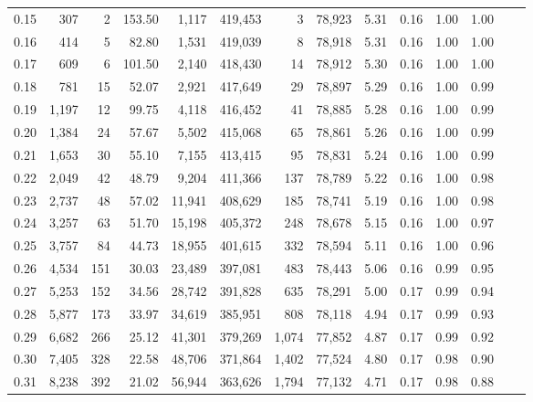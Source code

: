 \begin{tabular}{rrrrrrrrrrrrrr}
0.15 &     307 &      2 &  153.50 &    1,117 &  419,453 &       3 &  78,923 &  5.31 &  0.16 &  1.00 &      1.00 \\
0.16 &     414 &      5 &   82.80 &    1,531 &  419,039 &       8 &  78,918 &  5.31 &  0.16 &  1.00 &      1.00 \\
0.17 &     609 &      6 &  101.50 &    2,140 &  418,430 &      14 &  78,912 &  5.30 &  0.16 &  1.00 &      1.00 \\
0.18 &     781 &     15 &   52.07 &    2,921 &  417,649 &      29 &  78,897 &  5.29 &  0.16 &  1.00 &      0.99 \\
0.19 &   1,197 &     12 &   99.75 &    4,118 &  416,452 &      41 &  78,885 &  5.28 &  0.16 &  1.00 &      0.99 \\
0.20 &   1,384 &     24 &   57.67 &    5,502 &  415,068 &      65 &  78,861 &  5.26 &  0.16 &  1.00 &      0.99 \\
0.21 &   1,653 &     30 &   55.10 &    7,155 &  413,415 &      95 &  78,831 &  5.24 &  0.16 &  1.00 &      0.99 \\
0.22 &   2,049 &     42 &   48.79 &    9,204 &  411,366 &     137 &  78,789 &  5.22 &  0.16 &  1.00 &      0.98 \\
0.23 &   2,737 &     48 &   57.02 &   11,941 &  408,629 &     185 &  78,741 &  5.19 &  0.16 &  1.00 &      0.98 \\
0.24 &   3,257 &     63 &   51.70 &   15,198 &  405,372 &     248 &  78,678 &  5.15 &  0.16 &  1.00 &      0.97 \\
0.25 &   3,757 &     84 &   44.73 &   18,955 &  401,615 &     332 &  78,594 &  5.11 &  0.16 &  1.00 &      0.96 \\
0.26 &   4,534 &    151 &   30.03 &   23,489 &  397,081 &     483 &  78,443 &  5.06 &  0.16 &  0.99 &      0.95 \\
0.27 &   5,253 &    152 &   34.56 &   28,742 &  391,828 &     635 &  78,291 &  5.00 &  0.17 &  0.99 &      0.94 \\
0.28 &   5,877 &    173 &   33.97 &   34,619 &  385,951 &     808 &  78,118 &  4.94 &  0.17 &  0.99 &      0.93 \\
0.29 &   6,682 &    266 &   25.12 &   41,301 &  379,269 &   1,074 &  77,852 &  4.87 &  0.17 &  0.99 &      0.92 \\
0.30 &   7,405 &    328 &   22.58 &   48,706 &  371,864 &   1,402 &  77,524 &  4.80 &  0.17 &  0.98 &      0.90 \\
0.31 &   8,238 &    392 &   21.02 &   56,944 &  363,626 &   1,794 &  77,132 &  4.71 &  0.17 &  0.98 &      0.88 \\

\end{tabular}
